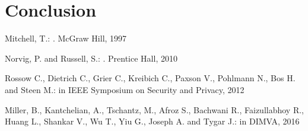 \documentclass{llncs}
\begin{document}
\section{Conclusion}\label{sec:conclusion}


\begin{thebibliography}{}

Mitchell, T.:
.
McGraw Hill, 1997

Norvig, P. and Russell, S.:
.
Prentice Hall, 2010

Rossow C., Dietrich C., Grier C., Kreibich C., Paxson V., Pohlmann N., Bos H. and Steen M.:
 in IEEE Symposium on Security and Privacy, 2012

Miller, B., Kantchelian, A., Tschantz, M., Afroz S., Bachwani R., Faizullabhoy R., Huang L., Shankar V., Wu T., Yiu G., Joseph A. and Tygar J.:
 in DIMVA, 2016


\end{thebibliography}
\end{document}
